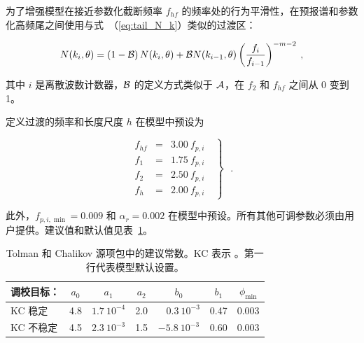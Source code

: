 \noindent
为了增强模型在接近参数化截断频率 $f_{hf}$ 的频率处的行为平滑性，在预报谱和参数化高频尾之间使用与式~（\ref{eq:tail_N_k}）类似的过渡区：


\begin{equation}
N(k_i,\theta) = \left ( 1 - {\cal{B}} \right ) N(k_{i},\theta) +
{\cal{B}} N(k_{i-1},\theta) \left ( \frac{f_i}{f_{i-1}}\right ) ^{-m-2}
\: , \label{eq:smtail}
\end{equation}

\noindent
其中 $i$ 是离散波数计数器，$\cal{B}$ 的定义方式类似于 $\cal{A}$，在 $f_2$ 和 $f_{hf}$ 之间从 0 变到 1。

定义过渡的频率和长度尺度 $h$ 在模型中预设为


\begin{equation} \left . \begin{array}{lll}
  f_{hf} & = & 3.00 \: f_{p,i}  \\
  f_1 & = & 1.75 \: f_{p,i}  \\
  f_2 & = & 2.50 \: f_{p,i}  \\
  f_h & = & 2.00 \: f_{p,i}
\end{array} \:\:\: \right \rbrace \:\:\: . \label{eq:TC_f} \end{equation}

\noindent
此外，$f_{p,i,\min} = 0.009$ 和 $\alpha_r = 0.002$ 在模型中预设。所有其他可调参数必须由用户提供。建议值和默认值见表~\ref{tab:TC_par}。


\begin{table} \begin{center}
\begin{tabular}{|l|c|c|c|c|c|c|} \hline \hline
调校目标：  & $a_0$ &      $a_1$       & $a_2$ &
            $b_0$           & $b_1$  & $\phi_{\min} $\\ \hline
KC 稳定   &  4.8  & $1.7 \: 10^{-4}$ &  2.0  &
 $ \:\:\:\: 0.3 \: 10^{-3}$ &  0.47  &  0.003  \\
KC 不稳定 &  4.5  & $2.3 \: 10^{-3}$ &  1.5  &
 $     -5.8 \: 10^{-3}$     &  0.60  &  0.003  \\ \hline \hline
\end{tabular} \end{center}
\caption{Tolman 和 Chalikov 源项包中的建议常数。KC 表示 \cite{art:KC92,ibk:KC94}。第一行代表模型默认设置。}
\label{tab:TC_par} \botline \end{table}

